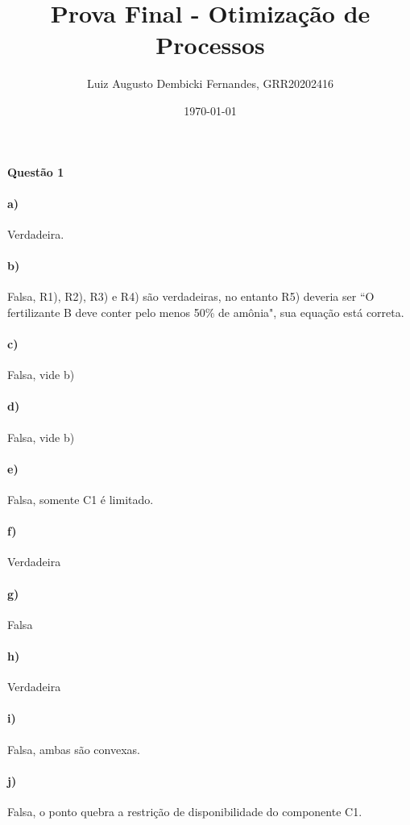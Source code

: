 \documentclass[]{article} %
\begin{document}
\title{Prova Final - Otimização de Processos}
\author{Luiz Augusto Dembicki Fernandes, GRR20202416}
\date{\today}
\maketitle

\paragraph{Questão 1}

\paragraph{a)} Verdadeira.

\paragraph{b)} Falsa, R1), R2), R3) e R4) são verdadeiras, no entanto R5) deveria ser
``O fertilizante B deve conter pelo menos 50\% de amônia", sua equação está correta.
\paragraph{c)} Falsa, vide b)
\paragraph{d)} Falsa, vide b)
\paragraph{e)} Falsa, somente C1 é limitado.
\paragraph{f)} Verdadeira
\paragraph{g)} Falsa
\paragraph{h)} Verdadeira
\paragraph{i)} Falsa, ambas são convexas.
\paragraph{j)} Falsa, o ponto quebra a restrição de disponibilidade do componente C1.
\end{document}

